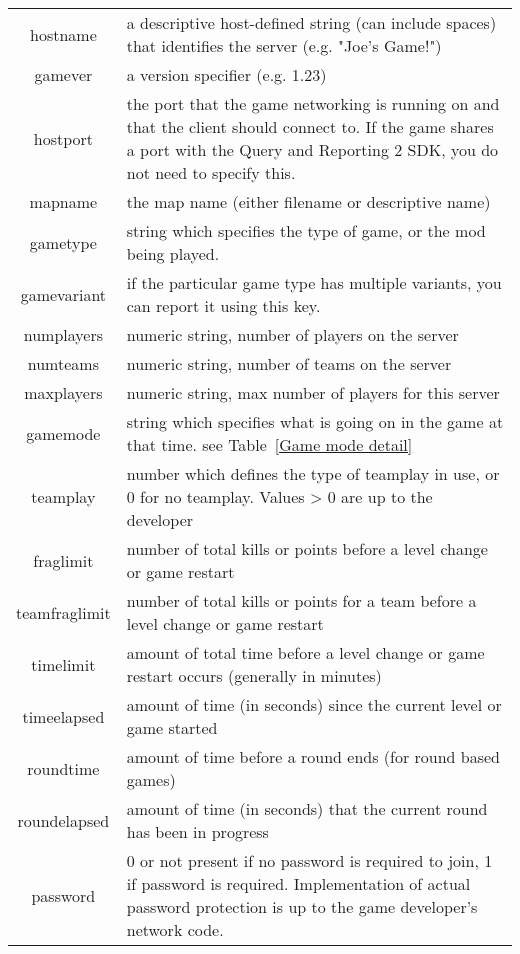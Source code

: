 \documentclass[oneside,titlepage,a4paper]{Definition/retrospy} %
\begin{document}
\begin{table}[H]
	\centering
	\begin{tabular}{C}
		\hline
		&\\\hline
		hostname &a descriptive host-defined string (can include spaces) that identifies the server (e.g. "Joe's Game!") \\\hline
		gamever &a version specifier (e.g. 1.23) \\\hline
		hostport &the port that the game networking is running on and that the client should connect to. If the game shares a port with the Query and Reporting 2 SDK, you do not need to specify this. \\\hline
		mapname &the map name (either filename or descriptive name) \\\hline
		gametype &string which specifies the type of game, or the mod being played. \\\hline
		gamevariant &if the particular game type has multiple variants, you can report it using this key. \\\hline
		numplayers  &numeric string, number of players on the server \\\hline
		numteams &numeric string, number of teams on the server \\\hline
		maxplayers &numeric string, max number of players for this server \\\hline
		gamemode &string which specifies what is going on in the game at that time. see Table~\ref{Game mode detail} \\\hline
		teamplay &number which defines the type of teamplay in use, or 0 for no teamplay. Values > 0 are up to the developer \\\hline
		fraglimit &number of total kills or points before a level change or game restart \\\hline
		teamfraglimit &number of total kills or points for a team before a level change or game restart \\\hline
		timelimit &amount of total time before a level change or game restart occurs (generally in minutes) \\\hline
		timeelapsed &amount of time (in seconds) since the current level or game started 
		\\\hline
		roundtime &amount of time before a round ends (for round based games) \\\hline
		roundelapsed &amount of time (in seconds) that the current round has been in progress 
		\\\hline
		password &0 or not present if no password is required to join, 1 if password is required. Implementation of actual password protection is up to the game developer's network code. \\\hline
		

\end{tabular}
\end{table}
\end{document}
